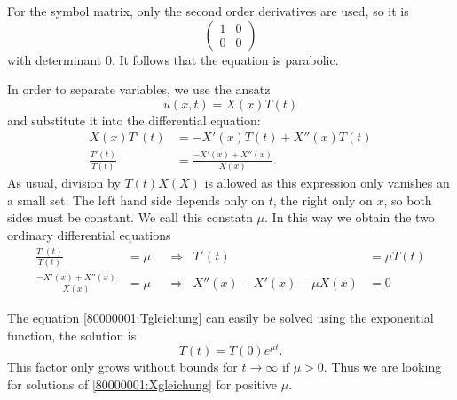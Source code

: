 \begin{loesung}
\begin{teilaufgaben}
\item
For the symbol matrix, only the second order derivatives are
used, so it is
\[
\begin{pmatrix}
1&0\\
0&0
\end{pmatrix}
\]
with determinant $0$.
It follows that the equation is parabolic.
\item
In order to separate variables, we use the ansatz
\[
u(x,t)=X(x)T(t)
\]
and substitute it into the differential equation:
\begin{align*}
X(x)T'(t)&=-X'(x)T(t)+X''(x)T(t)\\
\frac{T'(t)}{T(t)}&=\frac{-X'(x)+X''(x)}{X(x)}.
\end{align*}
As usual, division by $T(t)X(X)$ is allowed as this expression only
vanishes an a small set.
The left hand side depends only on $t$, the right only on $x$, so both
sides must be constant.
We call this constatn $\mu$.
In this way we obtain the two ordinary differential equations
\begin{align}
\frac{T'(t)}{T(t)}&=\mu&&\Rightarrow&T'(t)&=\mu T(t)
\label{80000001:Tgleichung}
\\
\frac{-X'(x)+X''(x)}{X(x)}&=\mu&&\Rightarrow&X''(x)-X'(x)-\mu X(x)&=0
\label{80000001:Xgleichung}
\end{align}
\item
The equation
\eqref{80000001:Tgleichung}
can easily be solved using the exponential function, the solution is
\[
T(t)=T(0)e^{\mu t}.
\]
This factor only grows without bounds for $t\to\infty$ if $\mu>0$.
Thus we are looking for solutions of \eqref{80000001:Xgleichung} for
positive $\mu$.


\end{teilaufgaben}
\end{loesung}
